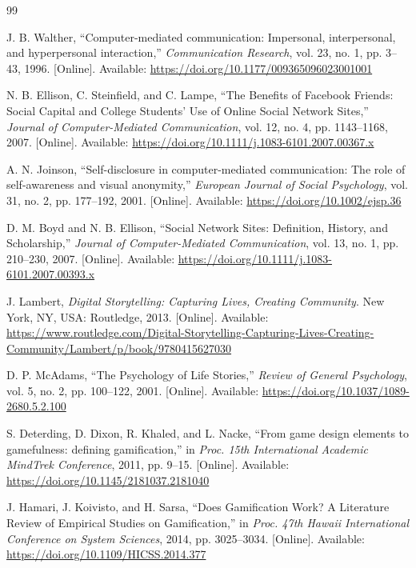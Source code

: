 ﻿\documentclass[12pt,a4paper]{report}
\begin{document}
\begin{thebibliography}{99}
\thispagestyle{empty}

J. B. Walther, ``Computer-mediated communication: Impersonal, interpersonal, and hyperpersonal interaction,'' \textit{Communication Research}, vol. 23, no. 1, pp. 3--43, 1996. [Online]. Available: \url{https://doi.org/10.1177/009365096023001001}

N. B. Ellison, C. Steinfield, and C. Lampe, ``The Benefits of Facebook Friends: Social Capital and College Students' Use of Online Social Network Sites,'' \textit{Journal of Computer-Mediated Communication}, vol. 12, no. 4, pp. 1143--1168, 2007. [Online]. Available: \url{https://doi.org/10.1111/j.1083-6101.2007.00367.x}

A. N. Joinson, ``Self-disclosure in computer-mediated communication: The role of self-awareness and visual anonymity,'' \textit{European Journal of Social Psychology}, vol. 31, no. 2, pp. 177--192, 2001. [Online]. Available: \url{https://doi.org/10.1002/ejsp.36}

D. M. Boyd and N. B. Ellison, ``Social Network Sites: Definition, History, and Scholarship,'' \textit{Journal of Computer-Mediated Communication}, vol. 13, no. 1, pp. 210--230, 2007. [Online]. Available: \url{https://doi.org/10.1111/j.1083-6101.2007.00393.x}

J. Lambert, \textit{Digital Storytelling: Capturing Lives, Creating Community}. New York, NY, USA: Routledge, 2013. [Online]. Available: \url{https://www.routledge.com/Digital-Storytelling-Capturing-Lives-Creating-Community/Lambert/p/book/9780415627030}

D. P. McAdams, ``The Psychology of Life Stories,'' \textit{Review of General Psychology}, vol. 5, no. 2, pp. 100--122, 2001. [Online]. Available: \url{https://doi.org/10.1037/1089-2680.5.2.100}

S. Deterding, D. Dixon, R. Khaled, and L. Nacke, ``From game design elements to gamefulness: defining gamification,'' in \textit{Proc. 15th International Academic MindTrek Conference}, 2011, pp. 9--15. [Online]. Available: \url{https://doi.org/10.1145/2181037.2181040}

J. Hamari, J. Koivisto, and H. Sarsa, ``Does Gamification Work? A Literature Review of Empirical Studies on Gamification,'' in \textit{Proc. 47th Hawaii International Conference on System Sciences}, 2014, pp. 3025--3034. [Online]. Available: \url{https://doi.org/10.1109/HICSS.2014.377}


\end{thebibliography}
\end{document}
